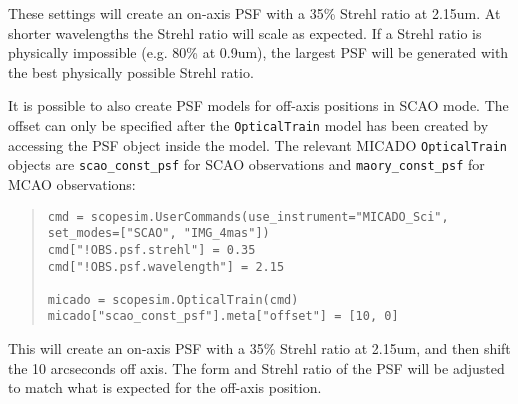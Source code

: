 These settings will create an on-axis PSF with a 35\% Strehl ratio at 2.15um.
At shorter wavelengths the Strehl ratio will scale as expected.
If a Strehl ratio is physically impossible (e.g. 80\% at 0.9um), the largest PSF will be generated with the best physically possible Strehl ratio.

It is possible to also create PSF models for off-axis positions in SCAO mode.
The offset can only be specified after the \texttt{OpticalTrain} model has been created by accessing the PSF object inside the model.
The relevant MICADO \texttt{OpticalTrain} objects are \texttt{scao\_const\_psf} for SCAO observations and \texttt{maory\_const\_psf} for MCAO observations:

\begin{quote}
\begin{alltt}
\begin{lstlisting}[frame=single]
cmd = scopesim.UserCommands(use_instrument="MICADO_Sci", set_modes=["SCAO", "IMG_4mas"])
cmd["!OBS.psf.strehl"] = 0.35
cmd["!OBS.psf.wavelength"] = 2.15

micado = scopesim.OpticalTrain(cmd)
micado["scao_const_psf"].meta["offset"] = [10, 0]
\end{lstlisting}
\end{alltt}
\end{quote}

This will create an on-axis PSF with a 35\% Strehl ratio at 2.15um, and then shift the 10 arcseconds off axis.
The form and Strehl ratio of the PSF will be adjusted to match what is expected for the off-axis position.


